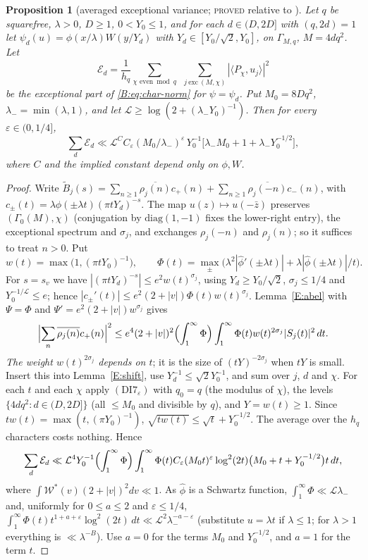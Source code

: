 \documentclass[10pt,reqno]{amsart}
\newtheorem{proposition}[theorem]{Proposition}
\theoremstyle{definition}
\numberwithin{equation}{section}
\newcommand{\cL}{\mathcal L}
\newcommand{\status}[1]{\textup{\textsc{#1}}}
\begin{document}
\begin{proposition}[averaged exceptional variance; \status{proved} relative to \cite{DI,Dr}]\label{E:var}
Let $q$ be squarefree, $\lambda>0$, $D\ge1$, $0<Y_0\le1$, and for each
$d\in(D,2D]$ with $(q,2d)=1$ let $\psi_d(u)=\phi(x/\lambda)W(y/Y_d)$ with
$Y_d\in[Y_0/\sqrt2,Y_0]$, on $\Gamma_{M,q}$, $M=4dq^2$. Let
\[
 \mathcal E_d=\frac1{h_q}\sum_{\chi\text{ even}\bmod q}\ \
 \sum_{j\ \mathrm{exc}\ (M,\chi)}|\langle P_\chi,u_j\rangle|^2
\]
be the exceptional part of \eqref{B:eq:char-norm} for $\psi=\psi_d$. Put
$M_0=8Dq^2$, $\lambda_-=\min(\lambda,1)$, and let
$\cL\ge\log(2+(\lambda_-Y_0)^{-1})$. Then for every
$\varepsilon\in(0,1/4]$,
\[
 \sum_{d}\mathcal E_d\ll\cL^CC_\varepsilon(M_0/\lambda_-)^{\varepsilon}\,
 Y_0^{-1}\bigl[\lambda_-M_0+1+\lambda_-Y_0^{-1/2}\bigr],
\]
where $C$ and the implied constant depend only on $\phi,W$.
\end{proposition}
\begin{proof}
Write $\widetilde B_j(s)=\sum_{n\ge1}\overline{\rho_j(n)}c_+(n)
+\sum_{n\ge1}\overline{\rho_j(-n)}c_-(n)$, with
$c_\pm(t)=\lambda\widehat\phi(\pm\lambda t)(\pi tY_d)^{-s}$.
The map $u(z)\mapsto u(-\bar z)$ preserves $(\Gamma_0(M),\chi)$ (conjugation by
$\mathrm{diag}(1,-1)$ fixes the lower-right entry), the exceptional
spectrum and $\sigma_j$, and exchanges $\rho_j(-n)$ and $\rho_j(n)$; so it
suffices to treat $n>0$. Put
\[
 w(t)=\max\bigl(1,(\pi tY_0)^{-1}\bigr),\qquad
 \Phi(t)=\max_\pm\bigl(\lambda^2|\widehat\phi'(\pm\lambda t)|
   +\lambda|\widehat\phi(\pm\lambda t)|/t\bigr).
\]
For $s=s_v$ we have $|(\pi tY_d)^{-s}|\le e^2w(t)^{\sigma_j}$, using
$Y_d\ge Y_0/\sqrt2$, $\sigma_j\le1/4$ and $Y_0^{-1/\cL}\le e$; hence
$|c_\pm'(t)|\le e^2(2+|v|)\Phi(t)w(t)^{\sigma_j}$. Lemma~\ref{E:abel} with
$\Psi=\Phi$ and $\Psi'=e^2(2+|v|)w^{\sigma_j}$ gives
\[
 \Bigl|\sum_n\overline{\rho_j(n)}c_+(n)\Bigr|^2\le
 e^4(2+|v|)^2\Bigl(\int_1^\infty\Phi\Bigr)\int_1^\infty
 \Phi(t)w(t)^{2\sigma_j}|S_j(t)|^2\,dt .
\]
\emph{The weight $w(t)^{2\sigma_j}$ depends on $t$}; it is the size of
$(tY)^{-2\sigma_j}$ when $tY$ is small. Insert this into
Lemma~\ref{E:shift}, use $Y_d^{-1}\le\sqrt2Y_0^{-1}$, and sum over $j$,
$d$ and $\chi$. For each $t$ and each $\chi$ apply $(\mathrm{DI7}_\varepsilon)$ with
$q_0=q$ (the modulus of $\chi$), the levels $\{4dq^2:d\in(D,2D]\}$ (all
$\le M_0$ and divisible by $q$), and $Y=w(t)\ge1$. Since
$tw(t)=\max(t,(\pi Y_0)^{-1})$, $\sqrt{tw(t)}\le\sqrt t+Y_0^{-1/2}$. The
average over the $h_q$ characters costs nothing. Hence
\[
 \sum_d\mathcal E_d\ll\cL^4Y_0^{-1}\Bigl(\int_1^\infty\Phi\Bigr)
 \int_1^\infty\Phi(t)C_\varepsilon(M_0t)^\varepsilon\log^2(2t)
 \bigl(M_0+t+Y_0^{-1/2}\bigr)t\,dt,
\]
where $\int\mathcal W^*(v)(2+|v|)^2dv\ll1$. As $\widehat\phi$ is a
Schwartz function, $\int_1^\infty\Phi\ll\cL\lambda_-$ and, uniformly for
$0\le a\le2$ and $\varepsilon\le1/4$,
$\int_1^\infty\Phi(t)t^{1+a+\varepsilon}\log^2(2t)\,dt\ll\cL^2\lambda_-^{-a-\varepsilon}$
(substitute $u=\lambda t$ if $\lambda\le1$; for $\lambda>1$ everything is
$\ll\lambda^{-B}$). Use $a=0$ for the terms $M_0$ and $Y_0^{-1/2}$, and $a=1$
for the term $t$.
\end{proof}
\end{document}
